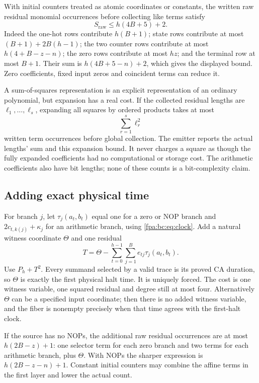 \documentclass[11pt,a4paper]{article}
\numberwithin{equation}{section}
\begin{document}
With initial counters treated as atomic coordinates or constants, the written
raw residual monomial occurrences before collecting like terms satisfy
\begin{equation}
 S_{\mathrm{raw}}\le h(4B+5)+2.\label{fpa:bc:eq:rawcost}
\end{equation}
Indeed the one-hot rows contribute $h(B+1)$; state rows contribute at most
$(B+1)+2B(h-1)$; the two counter rows contribute at most
$h(4+B-z-n)$; the zero rows contribute at most $hz$; and the terminal row
at most $B+1$. Their sum is $h(4B+5-n)+2$, which gives the displayed bound.
Zero coefficients, fixed input zeros and coincident terms can reduce it.

A sum-of-squares representation is an explicit representation of an ordinary
polynomial, but expansion has a real cost. If the collected residual lengths
are $\ell_1,\ldots,\ell_s$, expanding all squares by ordered products takes
at most
\begin{equation}
 \sum_{r=1}^{s}\ell_r^2\label{fpa:bc:eq:expansioncost}
\end{equation}
written term occurrences before global collection. The emitter reports the
actual lengths' sum and this expansion bound. It never charges a square as
though the fully expanded coefficients had no computational or storage cost.
The arithmetic coefficients also have bit lengths; none of these counts is
a bit-complexity claim.

\subsection{Adding exact physical time}
For branch $j$, let $\tau_j(a_t,b_t)$ equal one for a zero or NOP branch and
$2c_{t,k(j)}+\kappa_j$ for an arithmetic branch, using
\eqref{fpa:bc:eq:clock}. Add a natural witness coordinate $\Theta$ and one residual
\begin{equation}
 T=\Theta-\sum_{t=0}^{h-1}\sum_{j=1}^{B}e_{tj}\tau_j(a_t,b_t).
 \label{fpa:bc:eq:timepoly}
\end{equation}
Use $P_h+T^2$. Every summand selected by a valid trace is its proved CA duration,
so $\Theta$ is exactly the first physical halt time. It is uniquely forced.
The cost is one witness variable, one squared residual and degree still at
most four. Alternatively $\Theta$ can be a specified input coordinate; then
there is no added witness variable, and the fiber is nonempty precisely when
that time agrees with the first-halt clock.

If the source has no NOPs, the additional raw residual occurrences are at
most $h(2B-z)+1$: one selector term for each zero branch and two terms for
each arithmetic branch, plus $\Theta$. With NOPs the sharper expression is
$h(2B-z-n)+1$. Constant initial counters may combine the affine terms in the
first layer and lower the actual count.
\end{document}
